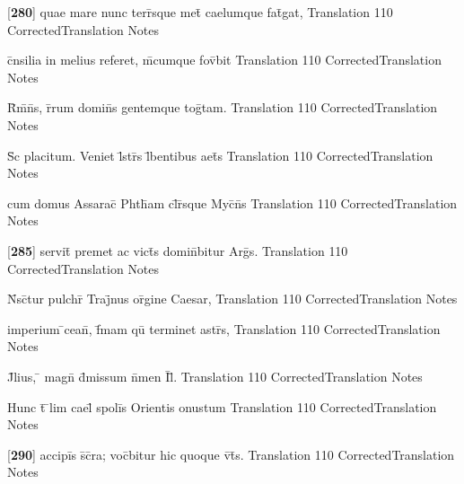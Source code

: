 \documentclass[]{book}
\begin{document}
\latline
  {[\textbf{280}] quae mare nunc terr\={}sque met\={} caelumque fat\={\macron {\i}}gat,}
  { Translation }
  {110}
  { CorrectedTranslation }
  { Notes }


\latline
  {c\={}nsilia in melius referet, m\={}cumque fov\={}bit}
  { Translation }
  {110}
  { CorrectedTranslation }
  { Notes }


\latline
  {R\={}m\={}n\={}s, r\={}rum domin\={}s gentemque tog\={}tam.}
  { Translation }
  {110}
  { CorrectedTranslation }
  { Notes }


\latline
  {S\={\macron {\i}}c placitum.  Veniet l\={}str\={\macron {\i}}s l\={}bentibus aet\={}s}
  { Translation }
  {110}
  { CorrectedTranslation }
  { Notes }


\latline
  {cum domus Assarac\={\macron {\i}} Phth\={\macron {\i}}am cl\={}r\={}sque Myc\={}n\={}s}
  { Translation }
  {110}
  { CorrectedTranslation }
  { Notes }


\latline
  {[\textbf{285}] servit\={} premet ac vict\={\macron {\i}}s domin\={}bitur Arg\={\macron {\i}}s.}
  { Translation }
  {110}
  { CorrectedTranslation }
  { Notes }


\latline
  {N\={}sc\={}tur pulchr\={} Traj\={}nus or\={\macron {\i}}gine Caesar,}
  { Translation }
  {110}
  { CorrectedTranslation }
  { Notes }


\latline
  {imperium \={}cean\={}, f\={}mam qu\={\macron {\i}} terminet astr\={\macron {\i}}s,}
  { Translation }
  {110}
  { CorrectedTranslation }
  { Notes }


\latline
  {J\={}lius, \={} magn\={} d\={}missum n\={}men I\={}l\={}.}
  { Translation }
  {110}
  { CorrectedTranslation }
  { Notes }


\latline
  {Hunc t\={} \={}lim cael\={} spoli\={\macron {\i}}s Orientis onustum}
  { Translation }
  {110}
  { CorrectedTranslation }
  { Notes }


\latline
  {[\textbf{290}] accipi\={}s s\={}c\={}ra; voc\={}bitur hic quoque v\={}t\={\macron {\i}}s.}
  { Translation }
  {110}
  { CorrectedTranslation }
  { Notes }
\end{document}
